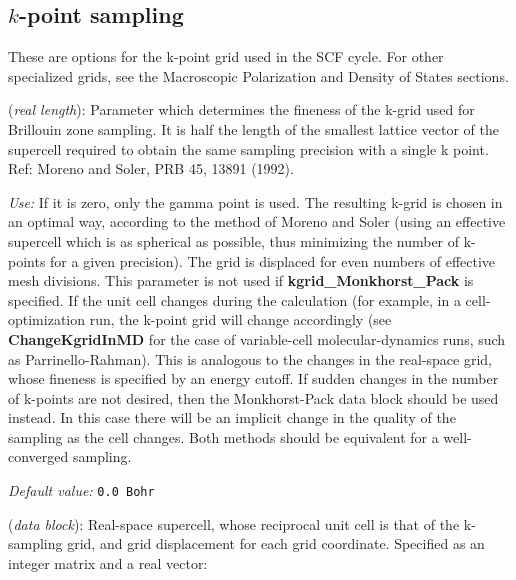 \subsection{\texorpdfstring{$k$}{k}-point sampling}

These are options for the k-point grid used in the SCF cycle. For
other specialized grids, see the Macroscopic Polarization and Density
of States sections.

\begin{description}
\itemsep 10pt
\parsep 0pt


\item[\textbf{kgrid\_cutoff}] (\textit{real length}):
Parameter which determines
the fineness of the k-grid used for Brillouin zone sampling.
It is half the length of the smallest lattice vector of the supercell
required to obtain the same sampling precision with a single k point.
Ref: Moreno and Soler, PRB 45, 13891 (1992).

\textit{Use:} If it is zero, only the gamma point is used.  The resulting
k-grid is chosen in an optimal way, according to the method of Moreno
and Soler (using an effective supercell which is as spherical as
possible, thus minimizing the number of k-points for a given
precision). The grid is displaced for even numbers of effective mesh
divisions.  This parameter is not used if \textbf{kgrid\_Monkhorst\_Pack}
is specified. If the unit cell changes during the calculation (for
example, in a cell-optimization run, the k-point
grid will change accordingly (see \textbf{ChangeKgridInMD} for the case
of variable-cell molecular-dynamics runs, such as Parrinello-Rahman).
This is analogous to the changes in the
real-space grid, whose fineness is specified by an energy cutoff. If
sudden changes in the number of k-points are not desired, then the
Monkhorst-Pack data block should be used instead. In this case there
will be an implicit change in the quality of the sampling as the cell
changes. Both methods should be equivalent for a well-converged
sampling.

\textit{Default value:} \texttt{0.0 Bohr}


\item[\textbf{kgrid\_Monkhorst\_Pack}] (\textit{data block}):
Real-space supercell, whose reciprocal unit cell is that of the
k-sampling grid, and grid displacement for each grid coordinate.
Specified as an integer matrix and a real vector:


\end{description}
